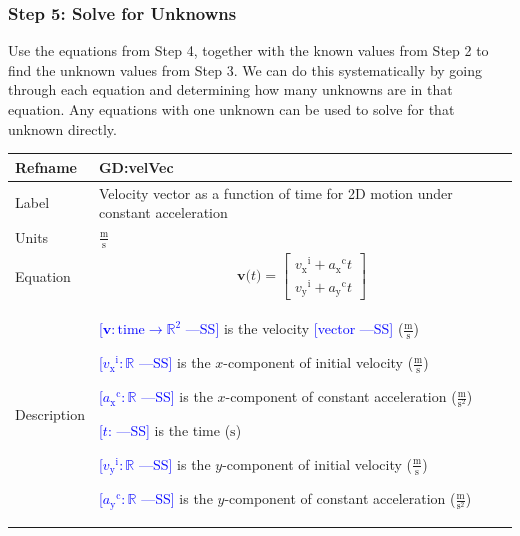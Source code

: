 \documentclass[12pt]{article}
\newcommand{\authornote}[3]{\textcolor{#1}{[#3 ---#2]}}
\newcommand{\authornote}[3]{}
\newcommand{\wss}[1]{\authornote{blue}{SS}{#1}}
\begin{document}
\subsubsection{Step 5: Solve for Unknowns}
\label{sec:org5bdde54}

Use the equations from Step 4, together with the known values from
Step 2 to find the unknown values from Step 3.  We can do this
systematically by going through each equation and determining how many
unknowns are in that equation.  Any equations with one unknown can be
used to solve for that unknown directly.


\noindent
\begin{minipage}{\textwidth}
\begin{tabular}{>{\raggedright}p{}>{\raggedright\arraybackslash}p{}}
\toprule \textbf{Refname} & \textbf{GD:velVec}
\label{GD:velVec}
\\ \midrule
Label & Velocity vector as a function of time for 2D motion under constant acceleration
        
\\ \midrule
Units & $\frac{\text{m}}{\text{s}}$
        
\\ \midrule
Equation & \begin{displaymath}
           \symbf{v}\text{(}t\text{)}=\begin{bmatrix}
                                      {{v_{\text{x}}}^{\text{i}}}+{{a_{\text{x}}}^{\text{c}}} t\\
                                      {{v_{\text{y}}}^{\text{i}}}+{{a_{\text{y}}}^{\text{c}}} t
                                      \end{bmatrix}
           \end{displaymath}
\\ \midrule
Description & \begin{symbDescription}
              \item{\wss{$\symbf{v}: \text{time} \rightarrow \mathbb{R}^2$} is the velocity \wss{vector} ($\frac{\text{m}}{\text{s}}$)}
              \item{\wss{${{v_{\text{x}}}^{\text{i}}}: \mathbb{R}$} is the $x$-component of initial velocity ($\frac{\text{m}}{\text{s}}$)}
              \item{\wss{${{a_{\text{x}}}^{\text{c}}}: \mathbb{R}$} is the $x$-component of constant acceleration ($\frac{\text{m}}{\text{s}^{2}}$)}
              \item{\wss{$t$: \text{time}} is the time (${\text{s}}$)}
              \item{\wss{${{v_{\text{y}}}^{\text{i}}}: \mathbb{R}$} is the $y$-component of initial velocity ($\frac{\text{m}}{\text{s}}$)}
              \item{\wss{${{a_{\text{y}}}^{\text{c}}}: \mathbb{R}$} is the $y$-component of constant acceleration ($\frac{\text{m}}{\text{s}^{2}}$)}
              \end{symbDescription}
\\ \midrule


\end{tabular}
\end{minipage}
\end{document}
